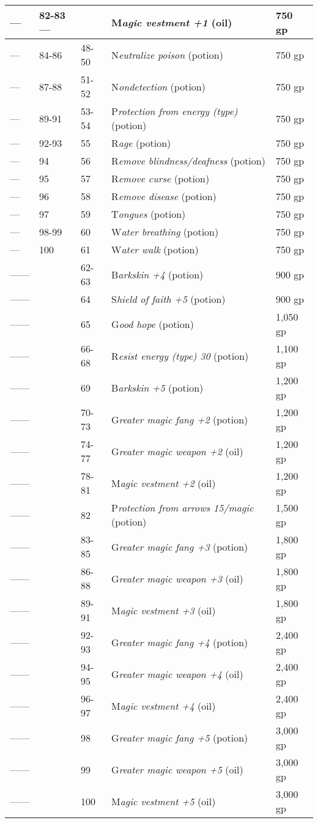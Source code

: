 \documentclass{article}
\begin{document}
\begin{tabular}{|>{\raggedright}p{27pt}|>{\raggedright}p{34pt}|>{\raggedright}p{26pt}|>{\raggedright}p{149pt}|>{\raggedright}p{52pt}|}
\hline
--- & 82-83--- &  & M\textit{agic vestment +1 }(oil) & 750 gp\tabularnewline
\hline
--- & 84-86 & 48-50 & N\textit{eutralize poison }(potion) & 750 gp\tabularnewline
\hline
--- & 87-88 & 51-52 & N\textit{ondetection }(potion) & 750 gp\tabularnewline
\hline
--- & 89-91 & 53-54 & P\textit{rotection from energy (type) }(potion) & 750 gp\tabularnewline
\hline
--- & 92-93 & 55 & R\textit{age }(potion) & 750 gp\tabularnewline
\hline
--- & 94 & 56 & R\textit{emove blindness/deafness }(potion) & 750 gp\tabularnewline
\hline
--- & 95 & 57 & R\textit{emove curse }(potion) & 750 gp\tabularnewline
\hline
--- & 96 & 58 & R\textit{emove disease }(potion) & 750 gp\tabularnewline
\hline
--- & 97 & 59 & T\textit{ongues }(potion) & 750 gp\tabularnewline
\hline
--- & 98-99 & 60 & W\textit{ater breathing }(potion) & 750 gp\tabularnewline
\hline
--- & 100 & 61 & W\textit{ater walk }(potion) & 750 gp\tabularnewline
\hline
------ &  & 62-63 & B\textit{arkskin +4 }(potion) & 900 gp\tabularnewline
\hline
------ &  & 64 & S\textit{hield of faith +5 }(potion) & 900 gp\tabularnewline
\hline
------ &  & 65 & G\textit{ood hope }(potion) & 1,050 gp\tabularnewline
\hline
------ &  & 66-68 & R\textit{esist energy (type) 30 }(potion) & 1,100 gp\tabularnewline
\hline
------ &  & 69 & B\textit{arkskin +5 }(potion) & 1,200 gp\tabularnewline
\hline
------ &  & 70-73 & G\textit{reater magic fang +2 }(potion) & 1,200 gp\tabularnewline
\hline
------ &  & 74-77 & G\textit{reater magic weapon +2 }(oil) & 1,200 gp\tabularnewline
\hline
------ &  & 78-81 & M\textit{agic vestment +2 }(oil) & 1,200 gp\tabularnewline
\hline
------ &  & 82 & P\textit{rotection from arrows 15/magic }(potion) & 1,500 gp\tabularnewline
\hline
------ &  & 83-85 & G\textit{reater magic fang +3 }(potion) & 1,800 gp\tabularnewline
\hline
------ &  & 86-88 & G\textit{reater magic weapon +3 }(oil) & 1,800 gp\tabularnewline
\hline
------ &  & 89-91 & M\textit{agic vestment +3 }(oil) & 1,800 gp\tabularnewline
\hline
------ &  & 92-93 & G\textit{reater magic fang +4 }(potion) & 2,400 gp\tabularnewline
\hline
------ &  & 94-95 & G\textit{reater magic weapon +4 }(oil) & 2,400 gp\tabularnewline
\hline
------ &  & 96-97 & M\textit{agic vestment +4 }(oil) & 2,400 gp\tabularnewline
\hline
------ &  & 98 & G\textit{reater magic fang +5 }(potion) & 3,000 gp\tabularnewline
\hline
------ &  & 99 & G\textit{reater magic weapon +5 }(oil) & 3,000 gp\tabularnewline
\hline
------ &  & 100 & M\textit{agic vestment +5 }(oil) & 3,000 gp\tabularnewline
\hline
\end{tabular}
\end{document}
